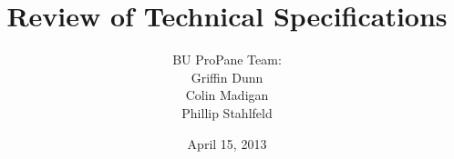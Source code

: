 \documentclass[]{article}
\begin{document}
	\begin{titlepage}



		\title{\textbf{Review of Technical Specifications}}
		\author{BU ProPane Team:\\Griffin Dunn\\Colin Madigan\\Phillip Stahlfeld}
		\date{April 15, 2013}
		\maketitle



		\noindent
		
		\thispagestyle{empty}

	\end{titlepage}
	
	\thispagestyle{empty}
	
	
	
	
	\setcounter{page}{1}
	\thispagestyle{empty}
	
\end{document}
